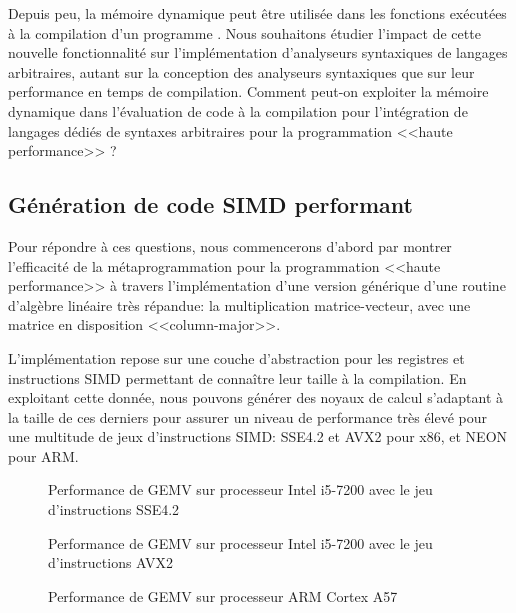\documentclass[main]{subfiles}
\begin{document}
Depuis peu, la m\'emoire dynamique peut \^etre utilis\'ee dans les fonctions
ex\'ecut\'ees \`a la compilation d'un programme \cpp. Nous souhaitons \'etudier
l'impact de cette nouvelle fonctionnalit\'e sur l'impl\'ementation d'analyseurs
syntaxiques de langages arbitraires, autant sur la conception des analyseurs
syntaxiques que sur leur performance en temps de compilation.
Comment peut-on exploiter la m\'emoire dynamique dans l'\'evaluation de code
\cpp \`a la compilation pour l'int\'egration de langages d\'edi\'es de syntaxes
arbitraires pour la programmation <<haute performance>> ?

\subsection*{G\'en\'eration de code SIMD performant}

Pour r\'epondre \`a ces questions, nous commencerons d'abord par montrer
l'efficacit\'e de la m\'etaprogrammation \cpp pour la programmation
<<haute performance>> \`a travers l'impl\'ementation d'une version
g\'en\'erique d'une routine d'alg\`ebre lin\'eaire tr\`es r\'epandue:
la multiplication matrice-vecteur, avec une matrice en disposition
<<column-major>>.

L'impl\'ementation repose sur une couche d'abstraction pour les registres et
instructions SIMD permettant de conna\^itre leur taille \`a la compilation.
En exploitant cette donn\'ee, nous pouvons g\'en\'erer des noyaux de calcul
s'adaptant \`a la taille de ces derniers pour assurer un niveau de performance
tr\`es \'elev\'e pour une multitude de jeux d'instructions SIMD: SSE4.2 et AVX2
pour x86, et NEON pour ARM.

\begin{figure}[h]
\fontsize{8}{10}\selectfont

\caption{
  Performance de GEMV sur processeur Intel i5-7200
  avec le jeu d'instructions SSE4.2
}
\label{fig:gemv-sse-bench-fr}
\end{figure}

\begin{figure}[h]
\fontsize{8}{10}\selectfont

\caption{
  Performance de GEMV sur processeur Intel i5-7200
  avec le jeu d'instructions AVX2
}
\label{fig:gemv-avx-bench-fr}
\end{figure}

\begin{figure}[h]
\fontsize{8}{10}\selectfont

\caption{
  Performance de GEMV sur processeur ARM Cortex A57
}
\label{fig:gemv-arm-bench-fr}
\end{figure}
\end{document}
